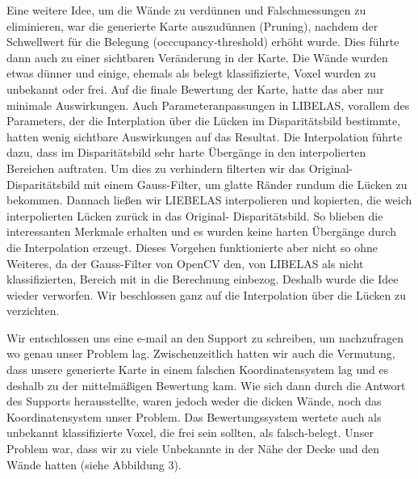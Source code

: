 \documentclass[12pt,titlepage, a4paper]{article}
\begin{document}
Eine weitere Idee, um die Wände zu verdünnen und Falschmessungen zu eliminieren, war die generierte Karte auszudünnen (Pruning), nachdem der Schwellwert für die Belegung (occcupancy-threshold) erhöht wurde. Dies führte dann auch zu einer sichtbaren Veränderung in der Karte. Die Wände wurden etwas dünner und einige, ehemals als belegt klassifizierte, Voxel wurden zu unbekannt oder frei. Auf die finale Bewertung der Karte, hatte das aber nur minimale Auswirkungen. Auch Parameteranpassungen in LIBELAS, vorallem des Parameters, der die Interplation über die Lücken im Disparitätsbild bestimmte, hatten wenig sichtbare Auswirkungen auf das Resultat. Die Interpolation führte dazu, dass im Disparitätsbild sehr harte Übergänge in den interpolierten Bereichen auftraten. Um dies zu verhindern filterten wir das Original-Disparitätsbild mit einem Gauss-Filter, um glatte Ränder rundum die Lücken zu bekommen. Dannach ließen wir LIEBELAS interpolieren und kopierten, die weich interpolierten Lücken zurück in das Original-
Disparitätsbild. So blieben die interessanten Merkmale erhalten und es wurden keine harten Übergänge durch die Interpolation erzeugt. Dieses Vorgehen funktionierte aber nicht so ohne Weiteres, da der Gauss-Filter von OpenCV den, von LIBELAS als nicht klassifizierten, Bereich mit in die Berechnung einbezog. Deshalb wurde die Idee wieder verworfen. Wir beschlossen ganz auf die Interpolation über die Lücken zu verzichten.

Wir entschlossen uns eine e-mail an den Support zu schreiben, um nachzufragen wo genau unser Problem lag.
Zwischenzeitlich hatten wir auch die Vermutung, dass unsere generierte Karte in einem falschen Koordinatensystem lag und es deshalb zu der mittelmäßigen Bewertung kam.
Wie sich dann durch die Antwort des Supports herausstellte, waren jedoch weder die dicken Wände, noch das Koordinatensystem unser Problem. Das Bewertungssystem wertete auch als unbekannt klassifizierte Voxel, die frei sein sollten, als falsch-belegt. Unser Problem war, dass wir zu viele Unbekannte in der Nähe der Decke und den Wände hatten (siehe Abbildung 3).
\end{document}
